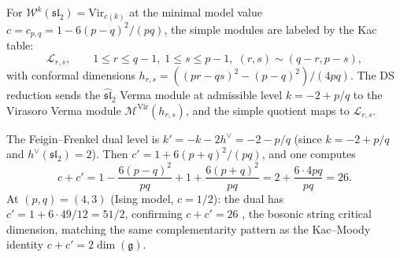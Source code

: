 \begin{example}
\label{ex:vir-minimal-modules}
For $\mathcal{W}^k(\mathfrak{sl}_2) = \mathrm{Vir}_{c(k)}$
at the minimal model value $c = c_{p,q} = 1 - 6(p-q)^2/(pq)$,
the simple modules are labeled by the Kac table:
\[
\mathcal{L}_{r,s}, \qquad
1 \leq r \leq q - 1,\; 1 \leq s \leq p - 1,\;
(r,s) \sim (q-r, p-s),
\]
with conformal dimensions $h_{r,s} = ((pr - qs)^2 - (p-q)^2)/(4pq)$.
The DS reduction sends the $\widehat{\mathfrak{sl}}_2$ Verma module
at admissible level $k = -2 + p/q$ to the Virasoro Verma module
$\mathcal{M}^{\mathrm{Vir}}(h_{r,s})$, and the simple quotient
maps to $\mathcal{L}_{r,s}$.

The Feigin--Frenkel dual level is $k' = -k - 2h^\vee = -2 - p/q$
(since $k = -2 + p/q$ and $h^\vee(\mathfrak{sl}_2) = 2$).  Then
$c' = 1 + 6(p+q)^2/(pq)$, and one computes
\[
c + c' = 1 - \frac{6(p-q)^2}{pq} + 1 + \frac{6(p+q)^2}{pq}
= 2 + \frac{6 \cdot 4pq}{pq} = 26.
\]
At $(p,q) = (4,3)$ (Ising model, $c = 1/2$): the dual has
$c' = 1 + 6 \cdot 49/12 = 51/2$, confirming $c + c' = 26$
, the bosonic string critical dimension, matching the same
complementarity pattern as the Kac--Moody identity
$c + c' = 2\dim(\mathfrak{g})$.
\end{example}

